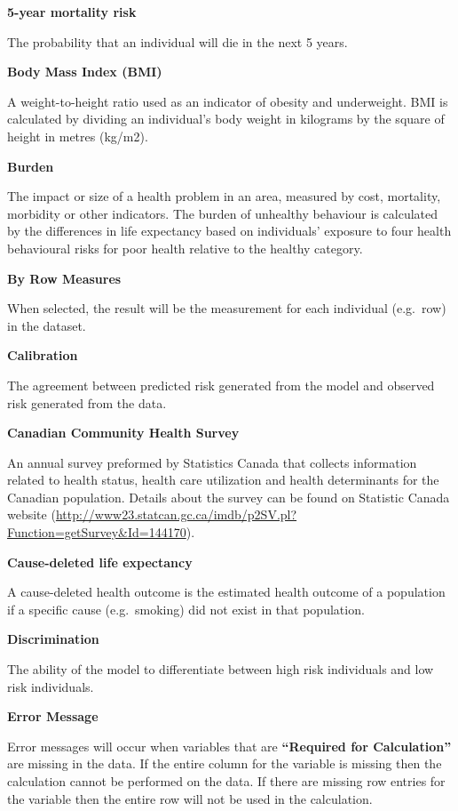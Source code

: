\documentclass[]{book}
\begin{document}
\textbf{5-year mortality risk}

The probability that an individual will die in the next 5 years.

\textbf{Body Mass Index (BMI)}

A weight-to-height ratio used as an indicator of obesity and
underweight. BMI is calculated by dividing an individual's body weight
in kilograms by the square of height in metres (kg/m2).

\textbf{Burden}

The impact or size of a health problem in an area, measured by cost,
mortality, morbidity or other indicators. The burden of unhealthy
behaviour is calculated by the differences in life expectancy based on
individuals' exposure to four health behavioural risks for poor health
relative to the healthy category.

\textbf{By Row Measures}

When selected, the result will be the measurement for
each individual (e.g.~row) in the dataset.

\textbf{Calibration}

The agreement between predicted risk generated from the model and
observed risk generated from the data.

\textbf{Canadian Community Health Survey}

An annual survey preformed by Statistics Canada that collects
information related to health status, health care utilization and health
determinants for the Canadian population. Details about the survey can
be found on Statistic Canada website
(\url{http://www23.statcan.gc.ca/imdb/p2SV.pl?Function=getSurvey\&Id=144170}).

\textbf{Cause-deleted life expectancy}

A cause-deleted health outcome is the estimated
health outcome of a population if a specific cause (e.g.~smoking) did
not exist in that population.

\textbf{Discrimination}

The ability of the model to differentiate between high risk individuals
and low risk individuals.

\textbf{Error Message}

Error messages will occur when variables that are
\textbf{``Required for Calculation''} are missing in the data. If the
entire column for the variable is missing then the calculation cannot be
performed on the data. If there are missing row entries for the variable
then the entire row will not be used in the calculation.
\end{document}
